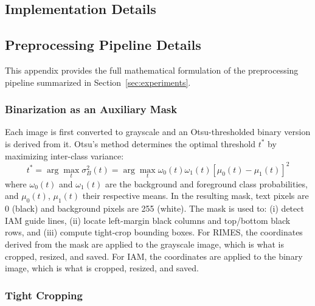 \begin{appendices}

\section{Implementation Details}\label{app:implementation}


\subsection{Preprocessing Pipeline Details}\label{app:preprocessing}

This appendix provides the full mathematical formulation of the preprocessing pipeline
summarized in Section~\ref{sec:experiments}.

\subsubsection{Binarization as an Auxiliary Mask}

Each image is first converted to grayscale and an Otsu-thresholded binary version is derived
from it. Otsu's method determines the optimal threshold $t^*$ by maximizing inter-class variance:
\begin{equation}
t^* = \arg\max_t \sigma_B^2(t) = \arg\max_t \omega_0(t) \omega_1(t) [\mu_0(t) - \mu_1(t)]^2
\end{equation}
where $\omega_0(t)$ and $\omega_1(t)$ are the background and foreground class probabilities,
and $\mu_0(t)$, $\mu_1(t)$ their respective means. In the resulting mask, text pixels are 0
(black) and background pixels are 255 (white). The mask is used to: (i) detect IAM guide lines,
(ii) locate left-margin black columns and top/bottom black rows, and (iii) compute tight-crop
bounding boxes. For RIMES, the coordinates derived from the mask are applied to the grayscale
image, which is what is cropped, resized, and saved. For IAM, the coordinates are applied to
the binary image, which is what is cropped, resized, and saved.

\subsubsection{Tight Cropping}
\label{app:tight-cropping}


\end{appendices}
